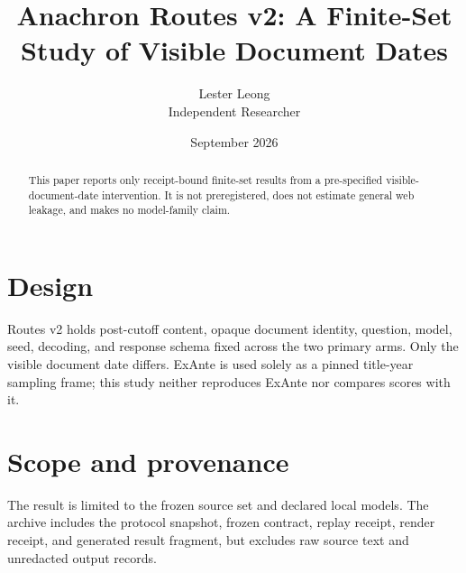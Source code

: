\documentclass[11pt]{article}
\title{Anachron Routes v2: A Finite-Set Study of Visible Document Dates}
\author{Lester Leong\\Independent Researcher}
\date{September 2026}
\begin{document}
\maketitle
\begin{abstract}
This paper reports only receipt-bound finite-set results from a pre-specified
visible-document-date intervention. It is not preregistered, does not estimate
general web leakage, and makes no model-family claim.
\end{abstract}
\section{Design}
Routes v2 holds post-cutoff content, opaque document identity, question, model,
seed, decoding, and response schema fixed across the two primary arms. Only the
visible document date differs. ExAnte is used solely as a pinned title-year
sampling frame; this study neither reproduces ExAnte nor compares scores with it.

\section{Scope and provenance}
The result is limited to the frozen source set and declared local models. The
archive includes the protocol snapshot, frozen contract, replay receipt, render
receipt, and generated result fragment, but excludes raw source text and
unredacted output records.
\end{document}
